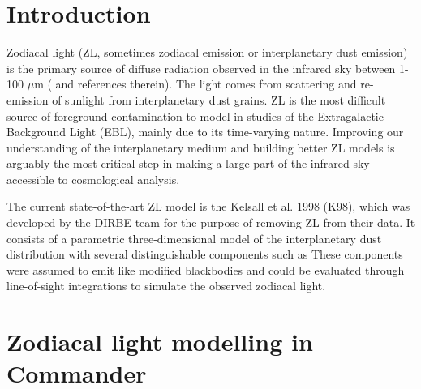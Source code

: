 \documentclass{aa}
\begin{document}

   \maketitle

\setcounter{tocdepth}{3}
\tableofcontents
   
\section{Introduction}
Zodiacal light (ZL, sometimes zodiacal emission or interplanetary dust emission) is the primary source of diffuse radiation observed in the infrared sky between 1-100 $\mu$m (\cite{leinert1998} and references therein). The light comes from scattering and re-emission of sunlight from interplanetary dust grains. ZL is the most difficult source of foreground contamination to model in studies of the Extragalactic Background Light (EBL), mainly due to its time-varying nature. Improving our understanding of the interplanetary medium and building better ZL models is arguably the most critical step in making a large part of the infrared sky accessible to cosmological analysis. 

The current state-of-the-art ZL model is the Kelsall et al. 1998 (K98), which was developed by the DIRBE team for the purpose of removing ZL from their data. It consists of a parametric three-dimensional model of the interplanetary dust distribution with several distinguishable components such as 
These components were assumed to emit like modified blackbodies and could be evaluated through line-of-sight integrations to simulate the observed zodiacal light. 

\section{Zodiacal light modelling in Commander}
\end{document}
